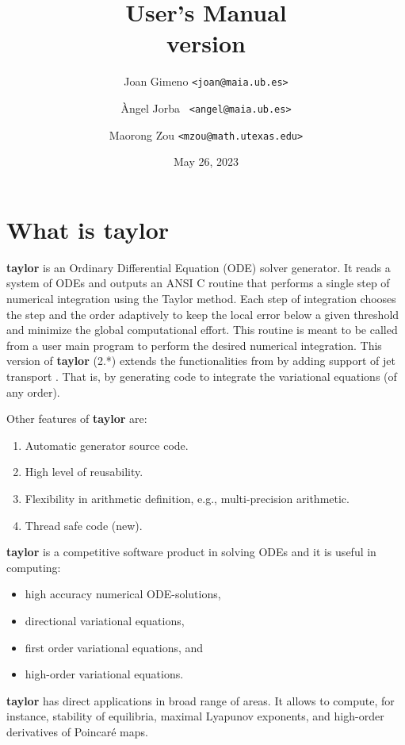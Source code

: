 \documentclass[10pt]{article}
\title{\taylorname{} User's Manual\\[.5em] \normalsize version \version{}}
\author{Joan Gimeno {\tt <joan@maia.ub.es>} \and \`Angel Jorba {\tt
    <angel@maia.ub.es>} \and Maorong Zou {\tt <mzou@math.utexas.edu>}}
\date{May 26, 2023} %
\theoremstyle{remark}
\newcommand{\taylorname}{{\bf taylor}}
\begin{document}
\maketitle

\vspace{-2em}\tableofcontents \newpage %

\section{What is \taylorname{}} \label{sec:whatis}
\taylorname{} is an Ordinary Differential Equation (ODE) solver
generator.  It reads a system of ODEs and outputs an ANSI C routine
that performs a single step of numerical integration using the Taylor
method. Each step of integration chooses the step and the order
adaptively to keep the local error below a given threshold and
minimize the global computational effort.  This routine is meant to be
called from a user main program to perform the desired numerical
integration. This version of \taylorname{} (2.*) extends the
functionalities from \cite{JZ} by adding support of jet transport
\cite{GJJMZ}. That is, by generating code to integrate the variational
equations (of any order).

\smallskip 

Other features of \taylorname{} are:
\begin{enumerate}
\renewcommand{\theenumi}{\roman{enumi}}
    \item Automatic generator source code.
    \item High level of reusability.
    \item Flexibility in arithmetic definition, e.g.,
      multi-precision arithmetic.
    \item Thread safe code ({\sc new}).
\end{enumerate}
\taylorname{} is a competitive software product in solving ODEs and it
is useful in computing:
\begin{itemize}
    \item high accuracy numerical ODE-solutions,
    \item directional variational equations,
    \item first order variational equations, and
    \item high-order variational equations.
\end{itemize}
\taylorname{} has direct applications in broad range of areas.  It
allows to compute, for instance, stability of equilibria, maximal
Lyapunov exponents, and high-order derivatives of Poincar\'e maps.
\end{document}
